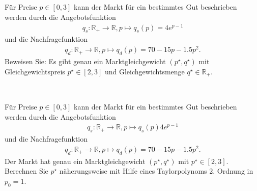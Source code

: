 \subsection*{}
Für Preise $ p \in [0,3] $ kann der Markt für ein bestimmtes Gut beschrieben werden durch die Angebotsfunktion
\begin{align*}
q_s : \mathbb{R}_+ \to \mathbb{R}, p \mapsto q_s(p)= 4 e^{p-1}
\end{align*}
und die Nachfragefunktion 
\begin{align*}
q_d: \mathbb{R}_+ \to \mathbb{R}, p \mapsto q_d(p) = 70 -15p -1.5p^2.
\end{align*}
Beweisen Sie: Es gibt genau ein Marktgleichgewicht $ (p^\star,q^\star) $ mit Gleichgewichtspreis $ p^\star \in [2,3]$ und Gleichgewichtsmenge $ q^\star \in \mathbb{R}_+ $.
\\
\\
\subsection*{}
Für Preise $ p \in [0,3] $ kann der Markt für ein bestimmtes Gut beschrieben werden durch die Angebotsfunktion
\begin{align*}
q_s : \mathbb{R}_+ \to \mathbb{R}, p \mapsto q_s(p) 4 e^{p-1}
\end{align*}
und die Nachfragefunktion 
\begin{align*}
q_d: \mathbb{R}_+ \to \mathbb{R}, p \mapsto q_d(p) = 70 -15p -1.5p^2.
\end{align*}
Der Markt hat genau ein Marktgleichgewicht $ (p^\star,q^\star) $ mit $ p^\star \in [2,3] $.\\
Berechnen Sie $ p^\star  $ näherungsweise mit Hilfe eines Taylorpolynoms 2. Ordnung in $ p_0 = 1 $.

